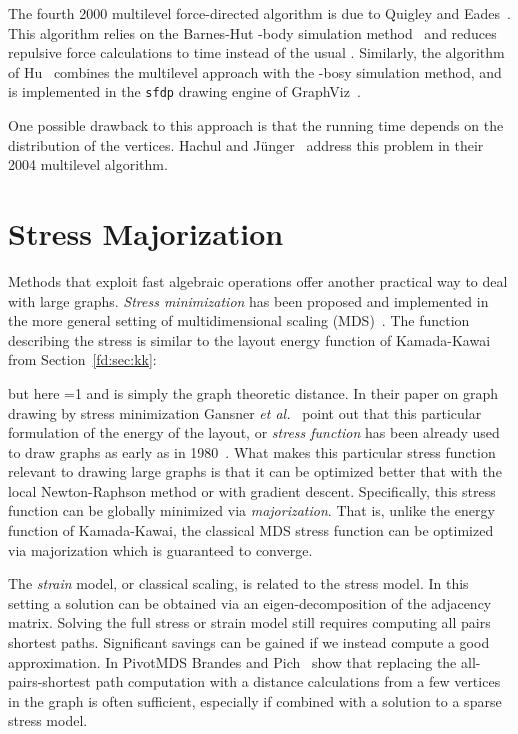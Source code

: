 \documentclass[notitlepage,letter,11pt]{article}
\begin{document}
The fourth 2000 multilevel force-directed algorithm is due to Quigley
and Eades~\cite{qe-fade-00}. This algorithm relies on the Barnes-Hut
-body simulation method~\cite{Barnes86a} and reduces repulsive
force calculations to  time instead of the usual
.  Similarly, the algorithm of Hu~\cite{Hu05} combines the multilevel
approach with the -bosy simulation method, and is implemented in
the {\tt sfdp} drawing engine of GraphViz~\cite{graphviz}.

One possible drawback to this approach is that the running
time depends on the distribution of the vertices. Hachul and
J{\"u}nger~\cite{hj-dlg-04} address this problem in their 2004 multilevel
algorithm. 



\section{Stress Majorization}
\label{fd:sec:stress}

Methods that exploit fast algebraic operations offer another practical
way to deal with large graphs. {\em Stress
  minimization} has been proposed and implemented in the more general
setting of multidimensional scaling (MDS)~\cite{oldKruskalMDS}. The
function describing the stress is similar to the layout energy function of Kamada-Kawai from
Section~\ref{fd:sec:kk}:

but here =1 and  is simply the graph
theoretic distance. In their paper on graph drawing by stress
minimization Gansner {\em et al.}~\cite{gkn-gdsm-04} point out that this
particular formulation of the energy of the layout, or {\em stress
  function} has been already used to draw graphs as early as in
1980~\cite{ks-dnd-80}. What makes this particular stress function relevant to drawing large
graphs is that it can be optimized better that
with the local Newton-Raphson method or with gradient descent. Specifically, this stress function can
be globally minimized via {\em majorization}. That is, unlike the
energy function of Kamada-Kawai, the classical MDS stress function can
be optimized via majorization which is guaranteed to converge.

The {\em strain} model, or classical scaling, is related to the stress
model. In this setting a solution can be obtained via an
eigen-decomposition of the adjacency matrix. Solving the full stress or strain model still requires computing all pairs
shortest paths. Significant savings can be gained if we instead
compute a good approximation. In PivotMDS Brandes and
Pich~\cite{bp-pmds-06} show that replacing the all-pairs-shortest path
computation with a distance calculations from a few vertices in the
graph is often sufficient, especially if combined with a solution to a
sparse stress model. 
\end{document}
